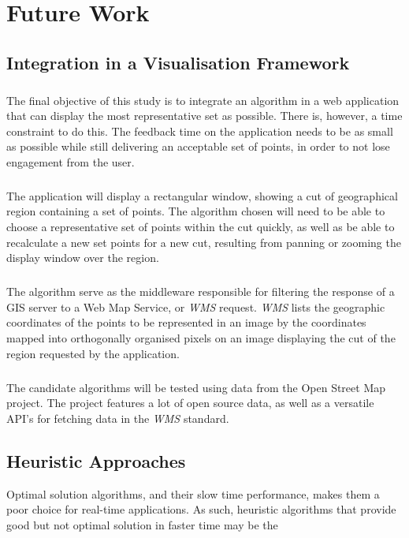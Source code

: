 \chapter{Future Work}
\label{chap:future}
\section{Integration in a Visualisation Framework}
\paragraph{}
The final objective of this study is to integrate an algorithm in a web application that can display the most representative set as possible. There is, however, a time constraint to do this. The feedback time on the application needs to be as small as possible while still delivering an acceptable set of points, in order to not lose engagement from the user.
\paragraph{}
The application will display a rectangular window, showing a cut of geographical region containing a set of points. The algorithm chosen will need to be able to choose a representative set of points within the cut quickly, as well as be able to recalculate a new set points for a new cut, resulting from panning or zooming the display window over the region.
\paragraph{}
The algorithm serve as the middleware responsible for filtering the response of a GIS server to a Web Map Service, or \emph{WMS} request. \emph{WMS} lists the geographic coordinates of the points to be represented in an image by the coordinates mapped into orthogonally organised pixels on an image displaying the cut of the region requested by the application.
\paragraph{}
The candidate algorithms will be tested using data from the Open Street Map project. The project features a lot of open source data, as well as a versatile API's for fetching data in the \emph{WMS} standard.

\section{Heuristic Approaches}
Optimal solution algorithms, and their slow time performance, makes them a poor choice for real-time applications. As such, heuristic algorithms that provide good but not optimal solution in faster time may be the
